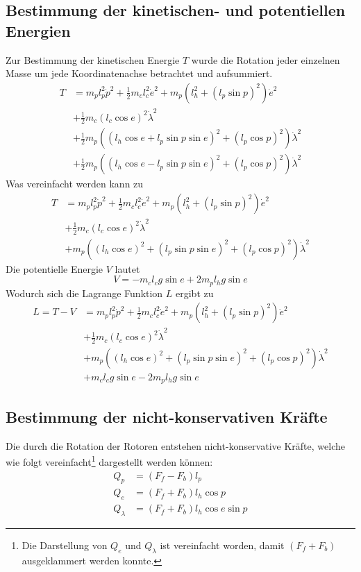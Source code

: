 \documentclass{article}
\begin{document}
\subsection{Bestimmung der kinetischen- und potentiellen Energien}
Zur Bestimmung der kinetischen Energie $T$ wurde die Rotation jeder einzelnen Masse um jede Koordinatenachse betrachtet und aufsummiert.
\begin{equation}
\begin{split}
T&= m_p l_p^2\dot{p}^2 + \frac{1}{2}m_cl_c^2\dot{e}^2 
+ m_p(l_h^2+(l_p\sin p)^2)\dot{e}^2\\
&+ \frac{1}{2} m_c (l_c \cos e)^2\dot{\lambda}^2\\
&+ \frac{1}{2} m_p((l_h \cos e +l_p \sin p \sin e)^2+(l_p \cos p)^2)\dot{\lambda}^2\\
&+ \frac{1}{2} m_p((l_h \cos e -l_p \sin p \sin e)^2+(l_p \cos p)^2)\dot{\lambda}^2
\end{split}
\end{equation}
Was vereinfacht werden kann zu
\begin{equation}
\begin{split}
T&= m_p l_p^2\dot{p}^2 + \frac{1}{2}m_cl_c^2\dot{e}^2 
+ m_p(l_h^2+(l_p\sin p)^2)\dot{e}^2\\
&+ \frac{1}{2} m_c (l_c \cos e)^2\dot{\lambda}^2\\
&+ m_p((l_h \cos e)^2 + (l_p \sin p \sin e)^2+(l_p \cos p)^2)\dot{\lambda}^2
\end{split}
\end{equation}
Die potentielle Energie $V$ lautet
\begin{equation}
V = -m_c l_c g \sin e + 2 m_p l_h g \sin e
\end{equation}
Wodurch sich die Lagrange Funktion $L$ ergibt zu 
\begin{equation}
\begin{split}
L = T - V&= m_p l_p^2\dot{p}^2 + \frac{1}{2}m_cl_c^2\dot{e}^2 
+ m_p(l_h^2+(l_p\sin p)^2)\dot{e}^2\\
&+ \frac{1}{2} m_c (l_c \cos e)^2\dot{\lambda}^2\\
&+ m_p((l_h \cos e)^2 + (l_p \sin p \sin e)^2+(l_p \cos p)^2)\dot{\lambda}^2\\
&+ m_c l_c g \sin e - 2 m_p l_h g \sin e
\end{split}
\end{equation}
\subsection{Bestimmung der nicht-konservativen Kräfte}
Die durch die Rotation der Rotoren entstehen nicht-konservative Kräfte, welche wie folgt vereinfacht\footnote{Die Darstellung von $Q_e$ und $Q_\lambda$ ist vereinfacht worden, damit $(F_f + F_b)$ ausgeklammert werden konnte.} dargestellt werden können:
\begin{align}
Q_p &= (F_f - F_b)l_p\\
Q_e &= (F_f + F_b)l_h  \cos p\\
Q_\lambda &= (F_f + F_b)l_h \cos e \sin p
\end{align}
\end{document}
